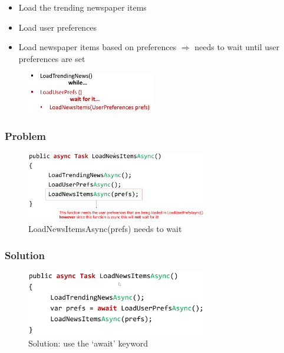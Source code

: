 \documentclass{article}
\begin{document}
\begin{itemize}
    \item Load the trending newspaper items
    \item Load user preferences
    \item Load newspaper items based on preferences $\Rightarrow$ needs to wait until user preferences are set
\end{itemize}

\begin{figure}[H]
    \centering
    \includegraphics[width=0.5\textwidth]{async-news.png}
    \caption{}
\end{figure}


\subsubsection{Problem}

\begin{figure}[H]
    \centering
    \includegraphics[width=0.7\textwidth]{async-news-problem.png}
    \caption{LoadNewsItemsAsync(prefs) needs to wait}
\end{figure}

\subsubsection{Solution}

\begin{figure}[H]
    \centering
    \includegraphics[width=0.7\textwidth]{async-news-solution.png}
    \caption{Solution: use the `await' keyword}
\end{figure}
\end{document}
